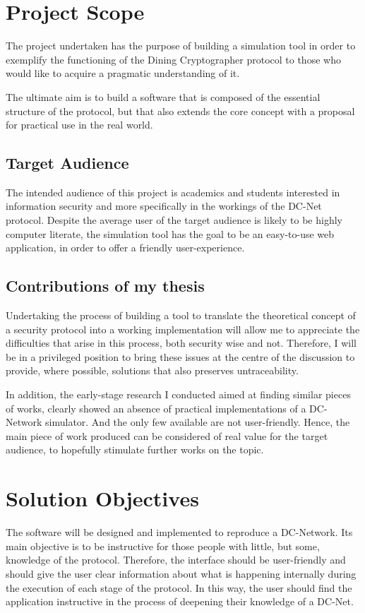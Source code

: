 \section{Project Scope}
The project undertaken has the purpose of building a simulation tool in order to exemplify the functioning of the Dining Cryptographer protocol to those who would like to acquire a pragmatic understanding of it. 

The ultimate aim is to build a software that is composed of the essential structure of the protocol, but that also extends the core concept with a proposal for practical use in the real world.

\subsection{Target Audience}
The intended audience of this project is academics and students interested in information security and more specifically in the workings of the DC-Net protocol. Despite the average user of the target audience is likely to be highly computer literate, the simulation tool has the goal to be an easy-to-use web application, in order to offer a friendly user-experience.

\subsection{Contributions of my thesis}
Undertaking the process of building a tool to translate the theoretical concept of a security protocol into a working implementation will allow me to appreciate the difficulties that arise in this process, both security wise and not. Therefore, I will be in a privileged position to bring these issues at the centre of the discussion to provide, where possible, solutions that also preserves untraceability.

In addition, the early-stage research I conducted aimed at finding similar pieces of works, clearly showed an absence of practical implementations of a DC-Network simulator. And the only few available are not user-friendly. Hence, the main piece of work produced can be considered of real value for the target audience, to hopefully stimulate further works on the topic.

\section{Solution Objectives}
The software will be designed and implemented to reproduce a DC-Network. Its main objective is to be instructive for those people with little, but some, knowledge of the protocol. Therefore, the interface should be user-friendly and should give the user clear information about what is happening internally during the execution of each stage of the protocol. In this way, the user should find the application instructive in the process of deepening their knowledge of a DC-Net.


